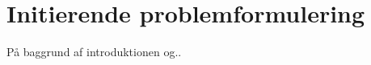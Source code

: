 \section{Initierende problemformulering}
\label{Initierende problemformulering}
På baggrund af introduktionen og..
%
\begin{quoteemph}
\end{quoteemph}